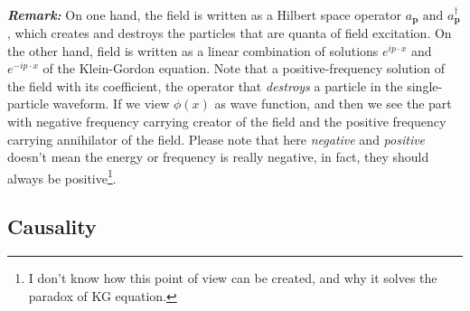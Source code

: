 \documentclass[12pt]{article}
\numberwithin{equation}{section}
\begin{document}
\\\indent \textit{\textbf{Remark:}} On one hand, the field is written as a Hilbert space operator $a_{\mathbf{p}} \text{ and }a^{\dagger}_{\mathbf{p}}$, which creates and destroys the particles that are quanta of field excitation.
On the other hand, field is written as a linear combination of solutions $e^{ip\cdot x}$ and $e^{-ip\cdot x}$ of the Klein-Gordon equation. 
Note that a positive-frequency solution of the field with its coefficient, the operator that \textit{destroys} a particle in the single-particle waveform. If we view $\phi(x)$ as wave function, and then we see the part with negative frequency carrying creator of the field and the positive frequency carrying annihilator of the field.
Please note that here \textit{negative} and \textit{positive} doesn't mean the energy or frequency is really negative, in fact, they should always be positive\footnote{I don't know how this point of view can be created, and why it solves the paradox of KG equation.}.
\subsection{Causality}
\end{document}
